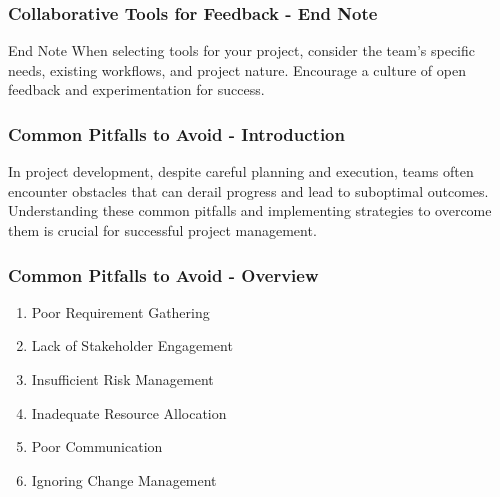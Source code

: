 \documentclass[aspectratio=169]{beamer}
\begin{document}
\begin{frame}[fragile]
    \frametitle{Collaborative Tools for Feedback - End Note}
    \begin{block}{End Note}
        When selecting tools for your project, consider the team's specific needs, existing workflows, and project nature. Encourage a culture of open feedback and experimentation for success.
    \end{block}
\end{frame}

\begin{frame}[fragile]
    \frametitle{Common Pitfalls to Avoid - Introduction}
    In project development, despite careful planning and execution, teams often encounter obstacles that can derail progress and lead to suboptimal outcomes. Understanding these common pitfalls and implementing strategies to overcome them is crucial for successful project management.
\end{frame}

\begin{frame}[fragile]
    \frametitle{Common Pitfalls to Avoid - Overview}
    \begin{enumerate}
        \item Poor Requirement Gathering
        \item Lack of Stakeholder Engagement
        \item Insufficient Risk Management
        \item Inadequate Resource Allocation
        \item Poor Communication
        \item Ignoring Change Management
    \end{enumerate}
\end{frame}
\end{document}
